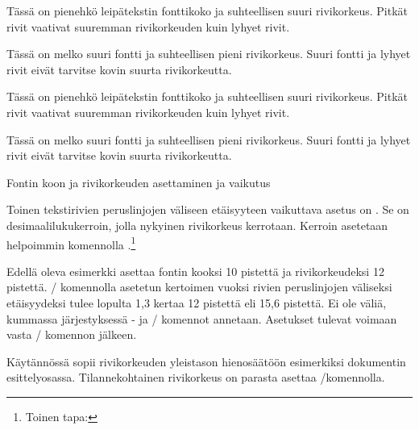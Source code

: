 \begin{esimerkki*}

\begin{koodilohko}
  \fontsize{8bp}{11bp}\selectfont Tässä on pienehkö leipätekstin
  fonttikoko ja suhteellisen suuri rivikorkeus. Pitkät rivit vaativat
  suuremman rivikorkeuden kuin lyhyet rivit.

  \fontsize{16bp}{17bp}\selectfont Tässä on melko suuri fontti ja
  suhteellisen pieni rivikorkeus. Suuri fontti ja lyhyet rivit eivät
  tarvitse kovin suurta rivikorkeutta.
\end{koodilohko}
\begin{tulos}
  \fontsize{8bp}{11bp}\selectfont Tässä on pienehkö leipätekstin
  fonttikoko ja suhteellisen suuri rivikorkeus. Pitkät rivit vaativat
  suuremman rivikorkeuden kuin lyhyet rivit.

  \fontsize{16bp}{17bp}\selectfont Tässä on melko suuri fontti ja
  suhteellisen pieni rivikorkeus. Suuri fontti ja lyhyet rivit eivät
  tarvitse kovin suurta rivikorkeutta.
\end{tulos}
\caption{Fontin koon ja rivikorkeuden asettaminen ja vaikutus}
\label{esim:rivikorkeus}
\end{esimerkki*}

Toinen tekstirivien peruslinjojen väliseen etäisyyteen vaikuttava asetus
on . Se on desimaalilukukerroin, jolla nykyinen
rivikorkeus kerrotaan. Kerroin asetetaan helpoimmin komennolla
.\footnote{Toinen tapa: }

\begin{koodilohkosis}
  \fontsize{10bp}{12bp} \linespread{1.3} \selectfont
\end{koodilohkosis}

Edellä oleva esimerkki asettaa fontin kooksi 10 pistettä ja
rivikorkeudeksi 12 pistettä. \-/ komennolla asetetun
kertoimen vuoksi rivien peruslinjojen väliseksi etäisyydeksi tulee
lopulta 1,3 kertaa 12 pistettä eli 15,6 pistettä. Ei ole väliä, kummassa
järjestyksessä - ja \-/ komennot
annetaan. Asetukset tulevat voimaan vasta \-/
komennon jälkeen.

Käytännössä  sopii rivikorkeuden yleistason
hienosäätöön esimerkiksi dokumentin esittelyosassa. Tilannekohtainen
rivikorkeus on parasta asettaa \-/komennolla.

